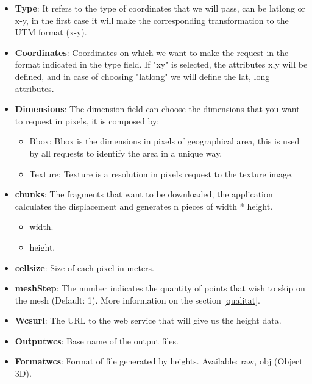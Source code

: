 \documentclass[10pt,a4paper,twocolumn,twoside]{article}
\begin{document}
\begin{itemize}
  \item \textbf{Type}: It refers to the type of coordinates that we will pass, can be latlong or x-y, in the first case it will make the corresponding transformation to the UTM format (x-y).
  
  \item \textbf{Coordinates}: Coordinates on which we want to make the request in the format indicated in the type field. If "xy" is selected, the attributes x,y will be defined, and in case of choosing "latlong" we will define the lat, long attributes.

  \item \textbf{Dimensions}: The dimension field can choose the dimensions that you want to request in pixels, it is composed by:
  
  \begin{itemize}
  \vspace{-0.2cm}
    \item Bbox: Bbox is the dimensions in pixels of geographical area, this is used by all requests to identify the area in a unique way.
    \item Texture: Texture is a resolution in pixels request to the texture image.
  \end{itemize}
  
  \item \textbf{chunks}: The fragments that want to be downloaded, the application calculates the displacement and generates n pieces of width * height.
  \vspace{-0.2cm}
  \begin{itemize}
    \item width.
    \item height.
  \end{itemize}

  \item \textbf{cellsize}: Size of each pixel in meters.
  \item \textbf{meshStep}: The number indicates the quantity of points that wish to skip on the mesh (Default: 1). More information on the section \ref{qualitat}.
  \item \textbf{Wcsurl}: The URL to the web service that will give us the height data.
  \item \textbf{Outputwcs}: Base name of the output files.
  \item \textbf{Formatwcs}: Format of file generated by heights. Available: raw, obj (Object 3D).


\end{itemize}
\end{document}
